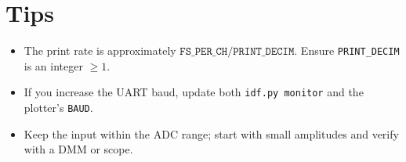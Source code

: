 \documentclass[11pt]{article}
\begin{document}
\section*{Tips}
\begin{itemize}
  \item The print rate is approximately \(\texttt{FS\_PER\_CH}/\texttt{PRINT\_DECIM}\). Ensure \texttt{PRINT\_DECIM} is an integer \(\ge 1\).
  \item If you increase the UART baud, update both \texttt{idf.py monitor} and the plotter's \texttt{BAUD}.
  \item Keep the input within the ADC range; start with small amplitudes and verify with a DMM or scope.
\end{itemize}
\end{document}
